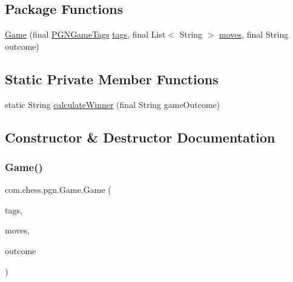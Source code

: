 \subsection*{Package Functions}
\begin{DoxyCompactItemize}
\item 
\mbox{\hyperlink{classcom_1_1chess_1_1pgn_1_1_game_a9edc31aa0825e54c68b8b9d95857af55}{Game}} (final \mbox{\hyperlink{classcom_1_1chess_1_1pgn_1_1_p_g_n_game_tags}{P\+G\+N\+Game\+Tags}} \mbox{\hyperlink{classcom_1_1chess_1_1pgn_1_1_game_aadfd202e33d988f6c6520ffea05908c6}{tags}}, final List$<$ String $>$ \mbox{\hyperlink{classcom_1_1chess_1_1pgn_1_1_game_a0aacc9d7cc963a7f7c6bb019f2799a2a}{moves}}, final String outcome)
\end{DoxyCompactItemize}
\subsection*{Static Private Member Functions}
\begin{DoxyCompactItemize}
\item 
static String \mbox{\hyperlink{classcom_1_1chess_1_1pgn_1_1_game_a1783f933301ad2504903d25d16fa7044}{calculate\+Winner}} (final String game\+Outcome)
\end{DoxyCompactItemize}


\subsection{Constructor \& Destructor Documentation}
\mbox{\label{classcom_1_1chess_1_1pgn_1_1_game_a9edc31aa0825e54c68b8b9d95857af55}} 
\subsubsection{\texorpdfstring{Game()}{Game()}}
{\footnotesize\ttfamily com.\+chess.\+pgn.\+Game.\+Game (\begin{DoxyParamCaption}\item[{final \mbox{\hyperlink{classcom_1_1chess_1_1pgn_1_1_p_g_n_game_tags}{P\+G\+N\+Game\+Tags}}}]{tags,  }\item[{final List$<$ String $>$}]{moves,  }\item[{final String}]{outcome }\end{DoxyParamCaption})\hspace{0.3cm}{\ttfamily [package]}}



